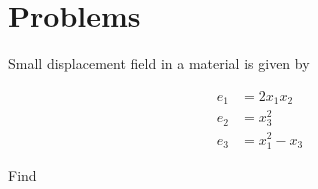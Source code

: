 % 
% 
% 
% 
% 
% 
% 
% 
% 
% 
% 
% 
\section{Problems}

\begin{Exercise}[
title={Strain tensor for a small displacement},
label={problem:strain:ps1q2a}
]

%
Small displacement field in a material is given by

\begin{align}\label{eqn:continuumProblemSet1:30}
e_1 &= 2 x_1 x_2 \\
e_2 &= x_3^2 \\
e_3 &= x_1^2 - x_3
\end{align}

Find

\label{problem:strain:ps1q2a1}
\label{problem:strain:ps1q2a2}
\end{Exercise}


